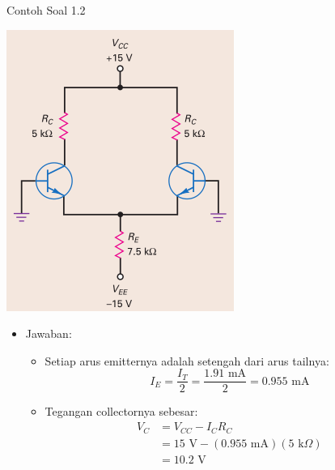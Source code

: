 \documentclass[aspectratio=169]{beamer}
\begin{document}
\begin{frame}{Contoh Soal 1.2}
	\begin{multicols}{2}
		\begin{center}
			\includegraphics[width=0.6\textheight]{gambar/01.latihan_soal_1a}
		\end{center}
		\columnbreak
		\begin{itemize}
			\item Jawaban:
			\begin{itemize}
				\item Setiap arus emitternya adalah setengah dari arus tailnya:
				\[ I_E = \frac{I_T}{2} = \frac{1.91 \text{ mA}}{2} = 0.955 \text{ mA} \]
				\item Tegangan collectornya sebesar:
				\begin{align*}
					V_C &= V_{CC} - I_C R_C \\
					&= 15 \text{ V} - (0.955 \text{ mA})(5 \text{ k}\Omega) \\
					&= 10.2 \text{ V}
				\end{align*}
			\end{itemize}
		\end{itemize}
		\vfill\null
	\end{multicols}
\end{frame}
\end{document}
